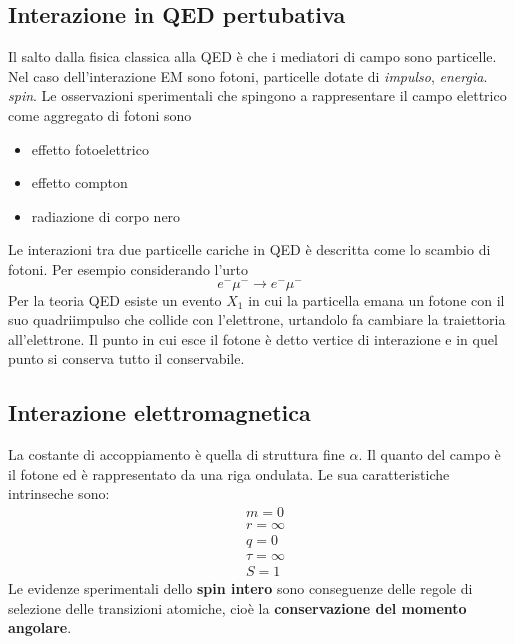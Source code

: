 \documentclass[12pt]{book}
\begin{document}
\subsection{Interazione in QED pertubativa}
Il salto dalla fisica classica alla QED è che i mediatori di campo sono particelle. Nel caso dell'interazione EM sono fotoni, particelle dotate di \emph{impulso}, \emph{energia}. \emph{spin}. Le osservazioni sperimentali che spingono a rappresentare il campo elettrico come aggregato di fotoni sono
\begin{itemize}
	\item effetto fotoelettrico
	\item effetto compton
	\item radiazione di corpo nero
\end{itemize}
Le interazioni tra due particelle cariche in QED è descritta come lo scambio di fotoni. Per esempio considerando l'urto 
\begin{equation}
	e^- \mu^- \rightarrow e^- \mu^- 
\end{equation}
Per la teoria QED esiste un evento $X_1$ in cui la particella emana un fotone con il suo quadriimpulso che collide con l'elettrone, urtandolo fa cambiare la traiettoria all'elettrone. Il punto in cui esce il fotone è detto vertice di interazione e in quel punto si conserva tutto il conservabile.

\subsection{Interazione elettromagnetica}
La costante di accoppiamento è quella di struttura fine $\alpha$.
Il quanto del campo è il fotone ed è rappresentato da una riga ondulata. Le sua caratteristiche intrinseche sono:
\begin{align}
	&m=0\\
	&r= \infty\\
	&q=0\\
	&\tau= \infty\\
	&S=1
\end{align}
Le evidenze sperimentali dello \textbf{spin intero} sono conseguenze delle regole di selezione delle transizioni atomiche, cioè la \textbf{conservazione del momento angolare}.
\end{document}
